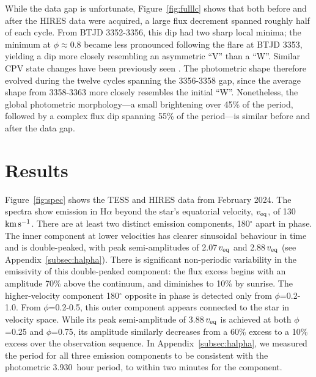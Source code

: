 \documentclass[11pt,twocolumn,tighten,linenumbers]{aastex7}
\newcommand{\kms}{\ensuremath{\rm km\,s^{-1}}}
\newcommand{\periodhr}{3.930}
\begin{document}
While the data gap is unfortunate, Figure~\ref{fig:fulllc} shows that
both before and after the HIRES data were acquired, a large flux
decrement spanned roughly half of each cycle.  From BTJD 3352-3356,
this dip had two sharp local minima;  the minimum at
$\phi$$\approx$0.8 became less pronounced following the flare at BTJD
3353, yielding a dip more closely resembling an asymmetric ``V'' than
a ``W''.  Similar CPV state changes have been previously seen
\citep{Stauffer2017,Bouma2024}.  The photometric shape therefore
evolved during the twelve cycles spanning the 3356-3358 gap, since the
average shape from 3358-3363 more closely resembles the initial ``W''.
Nonetheless, the global photometric morphology---a small brightening
over 45\% of the period, followed by a complex flux dip spanning 55\%
of the period---is similar before and after the data gap.


\section{Results}
\label{sec:results}

Figure~\ref{fig:spec} shows the TESS and HIRES data from February
2024.  The spectra  show emission in H$\alpha$
beyond the star's equatorial velocity, $v_{\rm eq}$, of 130\,\kms.
There are at least two distinct emission components, 180$^\circ$ apart
in phase.  The inner component at lower velocities has clearer
sinusoidal behaviour in time and is double-peaked, with peak
semi-amplitudes of 2.07\,$v_{\rm eq}$ and 2.88\,$v_{\rm eq}$ (see
Appendix~\ref{subsec:halpha}).  There is significant non-periodic
variability in the emissivity of this double-peaked component: the
flux excess begins with an amplitude 70\% above the continuum, and
diminishes to 10\% by sunrise.  The higher-velocity component
180$^\circ$ opposite in phase is detected only from $\phi$=0.2-1.0.
From $\phi$=0.2-0.5, this outer component appears connected to the
star in velocity space.  While its peak semi-amplitude of
3.88\,$v_{\rm eq}$ is achieved at both $\phi$=0.25 and $\phi$=0.75,
its amplitude similarly decreases from a 60\% excess to a 10\% excess
over the observation sequence.  In Appendix~\ref{subsec:halpha}, we
measured the period for all three emission components to be consistent
with the photometric \periodhr\ hour period, to within two minutes for
the  component.  
\end{document}

